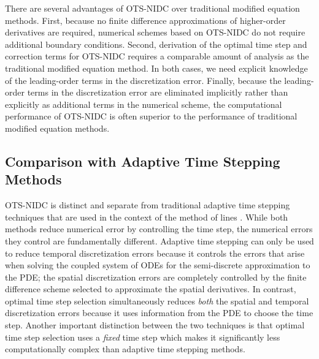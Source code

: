 \documentclass[fleqn,12pt,twoside]{article}
\begin{document}
There are several advantages of OTS-NIDC over traditional modified
equation methods.  First, because no finite difference approximations of
higher-order derivatives are required, numerical schemes based on OTS-NIDC
do not require additional boundary conditions.  Second, derivation
of the optimal time step and correction terms for OTS-NIDC requires a comparable
amount of analysis as the traditional modified equation method.  In both cases,
we need explicit knowledge of the leading-order terms in the discretization
error.  Finally, because the leading-order terms in the discretization error
are eliminated implicitly rather than explicitly as additional terms in the 
numerical scheme, the computational performance of OTS-NIDC is often
superior to the performance of traditional modified equation methods.


\subsection{Comparison with Adaptive Time Stepping Methods}
OTS-NIDC is distinct and separate from traditional adaptive time stepping 
techniques \cite{iserles_book,shampine_2005} that are used in the 
context of the method of lines \cite{iserles_book,gko_book}.  
While both methods reduce numerical error by controlling the time step, the 
numerical errors they control are fundamentally different.  Adaptive time 
stepping can only be used to reduce temporal discretization errors because it 
controls the errors that arise when solving the coupled system of ODEs for the 
semi-discrete approximation to the PDE; the spatial discretization errors 
are completely controlled by the finite difference scheme selected to 
approximate the spatial derivatives.  
In contrast, optimal time step selection simultaneously reduces 
\emph{both} the spatial and temporal discretization errors because it
uses information from the PDE to choose the time step.  Another important 
distinction between the two techniques is that optimal time step selection 
uses a \emph{fixed} time step which makes it significantly less 
computationally complex than adaptive time stepping methods.
\end{document}
